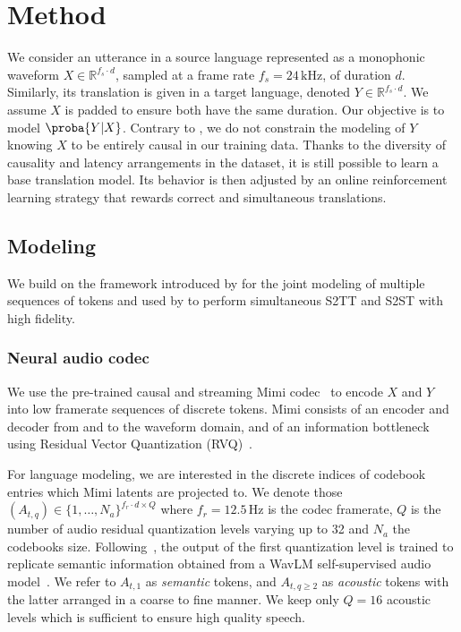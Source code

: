 \section{Method}
\label{method}

We consider an utterance in a source language represented as
a monophonic waveform $X \in\mathbb{R}^{f_s \cdot d}$, sampled at a frame rate $f_s = 24\,\mathrm{kHz}$, of duration $d$.
Similarly, its translation is given in a target language,
denoted $Y \in \mathbb{R}^{f_s \cdot d}$. We assume $X$ is padded to ensure both have the same duration. Our objective is to model $\proba{Y | X}$. Contrary to \citet{hibiki}, we do not constrain the modeling of $Y$ knowing $X$ to be entirely causal in our training data. Thanks to the diversity of causality and latency arrangements in the dataset, it is still possible to learn a base translation model. Its behavior is then adjusted by an online reinforcement learning strategy that rewards correct and simultaneous translations.

\subsection{Modeling}
\label{sec:modeling}

We build on the framework introduced by \citet{moshi} for the joint modeling of
multiple sequences of tokens and used by \citet{hibiki} to perform simultaneous S2TT and S2ST with high fidelity.


\subsubsection{Neural audio codec}
\label{sec:neural_audio_codec}

We use the pre-trained causal and streaming Mimi codec~\citep{moshi} to encode $X$ and $Y$ into low framerate sequences of discrete tokens.
Mimi consists of an encoder and decoder from and to the waveform domain, and of an information bottleneck using Residual Vector Quantization (RVQ)~\cite{soundstream}.

For language modeling, we are interested in the discrete
indices of codebook entries which Mimi latents are projected to. We denote those $(A_{t, q}) \in \{1, \ldots, N_a\}^{f_r \cdot d \times Q}$ where $f_r = 12.5 \,\text{Hz}$ is the codec framerate, $Q$ is the number of audio residual quantization levels varying up to 32 and $N_a$ the codebooks size. Following~\citet{zhang2024speechtokenizer,moshi}, the output
of the first quantization level is trained to replicate semantic information
obtained from a WavLM self-supervised audio model~\citep{wavlm}. We refer to $A_{t, 1}$ as \emph{semantic} tokens, and $A_{t, q \geq 2}$ as \emph{acoustic} tokens with the latter arranged in a coarse to fine manner. We keep only $Q=16$ acoustic levels which is sufficient to ensure high quality speech.

